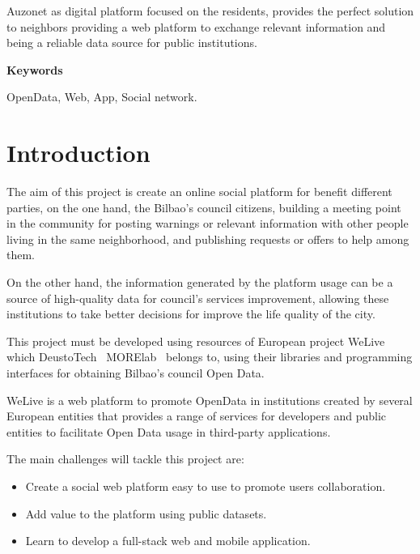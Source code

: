 \documentclass{DeustoFDP}
\begin{document}
Auzonet as digital platform focused on the residents, provides the perfect solution to neighbors providing a web platform to exchange relevant information and being a reliable data source for public institutions.

\vspace{2em}

{\Large\bfseries\sectionfont Keywords}
\vspace{3\medskipamount}

OpenData, Web, App, Social network.

\cleardoublepage\tableofcontents
\cleardoublepage\listoffigures
\cleardoublepage\listoftables
\cleardoublepage\listoflistings

\mainmatter
\pagestyle{phdthesis}

\chapter{Introduction}\label{cha:introduction}
The aim of this project is create an online social platform for benefit different parties, on the one hand, the Bilbao's council citizens, building a meeting point in the community for posting warnings or relevant information with other people living in the same neighborhood, and publishing requests or offers to help among them.

On the other hand, the information generated by the platform usage can be a source of high-quality data for council's services improvement, allowing these institutions to take better decisions for improve the life quality of the city.

This project must be developed using resources of European project WeLive~\cite{WeLive} which DeustoTech~\cite{DeustoTech} MORElab~\cite{Morelab} belongs to, using their libraries and programming interfaces for obtaining Bilbao's council Open Data. 

WeLive is a web platform to promote OpenData in institutions created by several European entities that provides a range of services for developers and public entities to facilitate Open Data usage in third-party applications.

The main challenges will tackle this project are:

\begin{itemize}
    \item Create a social web platform easy to use to promote users collaboration.
    \item Add value to the platform using public datasets.
    \item Learn to develop a full-stack web and mobile application.
\end{itemize}
\end{document}
